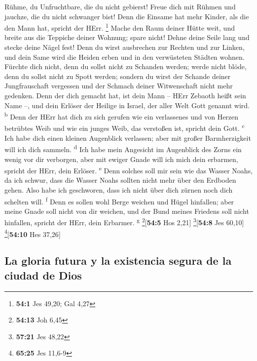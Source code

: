  Rühme, du Unfruchtbare, die du nicht gebierst! Freue dich
mit Rühmen und jauchze, die du nicht schwanger bist! Denn die Einsame
hat mehr Kinder, als die den Mann hat, spricht der HErr. \footnote{\textbf{54:1}
  Jes 49,20; Gal 4,27}  Mache den Raum deiner Hütte weit,
und breite aus die Teppiche deiner Wohnung; spare nicht! Dehne deine
Seile lang und stecke deine Nägel fest!  Denn du wirst
ausbrechen zur Rechten und zur Linken, und dein Same wird die Heiden
erben und in den verwüsteten Städten wohnen.  Fürchte dich
nicht, denn du sollst nicht zu Schanden werden; werde nicht blöde, denn
du sollst nicht zu Spott werden; sondern du wirst der Schande deiner
Jungfrauschaft vergessen und der Schmach deiner Witwenschaft nicht mehr
gedenken.  Denn der dich gemacht hat, ist dein Mann --
HErr Zebaoth heißt sein Name --, und dein Erlöser der Heilige in Israel,
der aller Welt Gott genannt wird. \textsuperscript{b} 
Denn der HErr hat dich zu sich gerufen wie ein verlassenes und von
Herzen betrübtes Weib und wie ein junges Weib, das verstoßen ist,
spricht dein Gott. \textsuperscript{c}  Ich habe dich
einen kleinen Augenblick verlassen; aber mit großer Barmherzigkeit will
ich dich sammeln. \textsuperscript{d}  Ich habe mein
Angesicht im Augenblick des Zorns ein wenig vor dir verborgen, aber mit
ewiger Gnade will ich mich dein erbarmen, spricht der HErr, dein
Erlöser. \textsuperscript{e}  Denn solches soll mir sein
wie das Wasser Noahs, da ich schwur, dass die Wasser Noahs sollten nicht
mehr über den Erdboden gehen. Also habe ich geschworen, dass ich nicht
über dich zürnen noch dich schelten will. \textsuperscript{f}
 Denn es sollen wohl Berge weichen und Hügel hinfallen;
aber meine Gnade soll nicht von dir weichen, und der Bund meines
Friedens soll nicht hinfallen, spricht der HErr, dein Erbarmer.
\textsuperscript{g} \footnote{\textbf{54:13} Joh 6,45}{[}\textbf{54:5}
Hos 2,21{]} \footnote{\textbf{57:21} Jes 48,22}{[}\textbf{54:8} Jes
60,10{]} \footnote{\textbf{65:25} Jes 11,6-9}{[}\textbf{54:10} Hes
37,26{]}

\hypertarget{la-gloria-futura-y-la-existencia-segura-de-la-ciudad-de-dios}{%
\subsection{La gloria futura y la existencia segura de la ciudad de
Dios}\label{la-gloria-futura-y-la-existencia-segura-de-la-ciudad-de-dios}}


